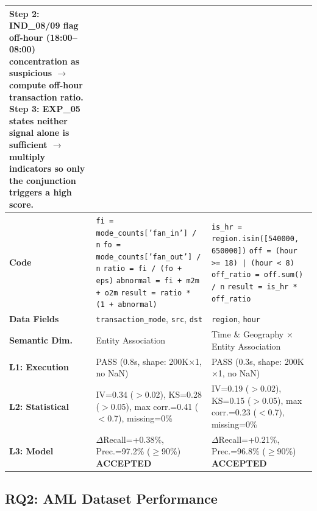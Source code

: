 \begin{table}[!t]
\begin{tabular}{p{2.4cm} p{6.9cm} p{6.9cm}}
Step 2: IND\_08/09 flag off-hour (18:00--08:00) concentration as suspicious $\to$ compute off-hour transaction ratio. \newline
Step 3: EXP\_05 states neither signal alone is sufficient $\to$ multiply indicators so only the conjunction triggers a high score. \\
\hline
\textbf{Code} &
\texttt{fi = mode\_counts['fan\_in'] / n} \newline
\texttt{fo = mode\_counts['fan\_out'] / n} \newline
\texttt{ratio = fi / (fo + eps)} \newline
\texttt{abnormal = fi + m2m + o2m} \newline
\texttt{result = ratio * (1 + abnormal)} &
\texttt{is\_hr = region.isin([540000, 650000])} \newline
\texttt{off = (hour >= 18) | (hour < 8)} \newline
\texttt{off\_ratio = off.sum() / n} \newline
\texttt{result = is\_hr * off\_ratio} \\
\hline
\textbf{Data Fields} & \texttt{transaction\_mode}, \texttt{src}, \texttt{dst} & \texttt{region}, \texttt{hour} \\
\hline
\textbf{Semantic Dim.} & Entity Association & Time \& Geography $\times$ Entity Association \\
\hline
\textbf{L1: Execution} & PASS (0.8s, shape: 200K$\times$1, no NaN) & PASS (0.3s, shape: 200K$\times$1, no NaN) \\
\hline
\textbf{L2: Statistical} & IV=0.34 ($>$0.02), KS=0.28 ($>$0.05), \newline max corr.=0.41 ($<$0.7), missing=0\% & IV=0.19 ($>$0.02), KS=0.15 ($>$0.05), \newline max corr.=0.23 ($<$0.7), missing=0\% \\
\hline
\textbf{L3: Model} & $\Delta$Recall=+0.38\%, Prec.=97.2\% ($\geq$90\%) \newline \textbf{ACCEPTED} & $\Delta$Recall=+0.21\%, Prec.=96.8\% ($\geq$90\%) \newline \textbf{ACCEPTED} \\
\hline
\end{tabular}
\end{table}

\subsection{RQ2: AML Dataset Performance}
\label{subsec:rq2}

